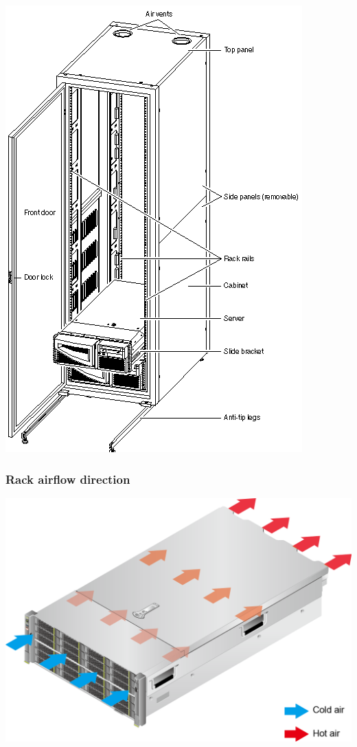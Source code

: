 \documentclass[slides]{pgnotes}
\begin{document}
\begin{center}
  \includegraphics[height=0.6\paperheight]{cabinet}
\end{center}

\subsubsection{Rack airflow direction}

\begin{center}
  \includegraphics[width=0.6\linewidth]{server_airflow_huawei}
\end{center}
\end{document}
